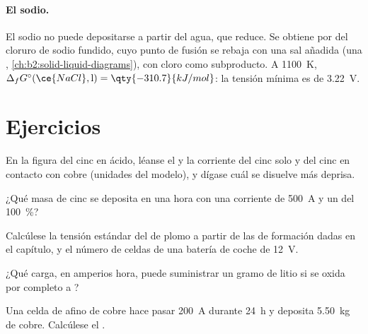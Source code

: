 \paragraph{El sodio.} El sodio no puede depositarse a partir del agua, que reduce.
Se obtiene por  del cloruro de sodio fundido, cuyo punto de fusión
se rebaja con una sal añadida (una , \cref{ch:b2:solid-liquid-diagrams}),
con cloro como subproducto. A \qty{1100}{K}, $\Delta_f G^\circ(\ce{NaCl}, \text{l}) =
\qty{-310.7}{kJ/mol}$: la tensión mínima es de \qty{3.22}{V}.

\section{Ejercicios}

\begin{exercise}[$\star$]\label{exo:b2:batteries-electrolysis:1}
En la figura del cinc en ácido, léanse el  y la corriente del cinc
solo y del cinc en contacto con cobre (unidades del modelo), y dígase cuál se disuelve
más deprisa.
\end{exercise}

\begin{exercise}[$\star$]\label{exo:b2:batteries-electrolysis:2}
¿Qué masa de cinc se deposita en una hora con una corriente de \qty{500}{A} y un
 del 100~\%?
\end{exercise}

\begin{exercise}[$\star$]\label{exo:b2:batteries-electrolysis:3}
Calcúlese la tensión estándar del  de plomo a partir de las 
de formación dadas en el capítulo, y el número de celdas de una batería de coche de
\qty{12}{V}.
\end{exercise}

\begin{exercise}[$\star$]\label{exo:b2:batteries-electrolysis:4}
¿Qué carga, en amperios hora, puede suministrar un gramo de litio si se oxida
por completo a ?
\end{exercise}

\begin{exercise}[$\star\star$]\label{exo:b2:batteries-electrolysis:5}
Una celda de afino de cobre hace pasar \qty{200}{A} durante \qty{24}{h} y deposita
\qty{5.50}{kg} de cobre. Calcúlese el .
\end{exercise}

